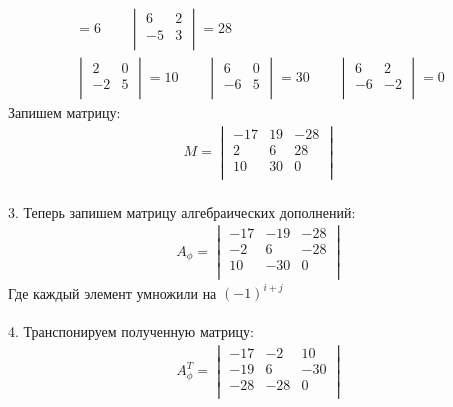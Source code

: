 \begin{enumerate}
\begin{gather*}
				= 6\qquad
				\begin{vmatrix}
					6 & 2\\
					-5 & 3\\
				\end{vmatrix}
				= 28\qquad
				\\
				\begin{vmatrix}
					2 & 0\\
					-2 & 5\\
				\end{vmatrix}
				= 10\qquad
				\begin{vmatrix}
					6 & 0\\
					-6 & 5\\
				\end{vmatrix}
				= 30\qquad
				\begin{vmatrix}
					6 & 2\\
					-6 & -2\\
				\end{vmatrix}
				= 0	
			\end{gather*}
			Запишем матрицу: 
			\begin{gather*}
				M = 
				\begin{vmatrix}
					-17 & 19 & -28\\
					2 & 6 & 28\\
					10 & 30 & 0\\
				\end{vmatrix}
			\end{gather*}
			\\
			3. Теперь запишем матрицу алгебраических дополнений: 
			\begin{gather*}
				A_{\phi} = 
				\begin{vmatrix}
					-17 & -19 & -28\\
					-2 & 6 & -28\\
					10 & -30 & 0\\
				\end{vmatrix}
			\end{gather*}
			Где каждый элемент умножили на $(-1)^{i + j}$\\
			\\
			4. Транспонируем полученную матрицу: 
			\begin{gather*}
				A_{\phi}^{T} =
				\begin{vmatrix}
					-17 & -2 & 10\\
					-19 & 6 & -30\\
					-28 & -28 & 0\\
				\end{vmatrix} 

\end{gather*}
\end{enumerate}
